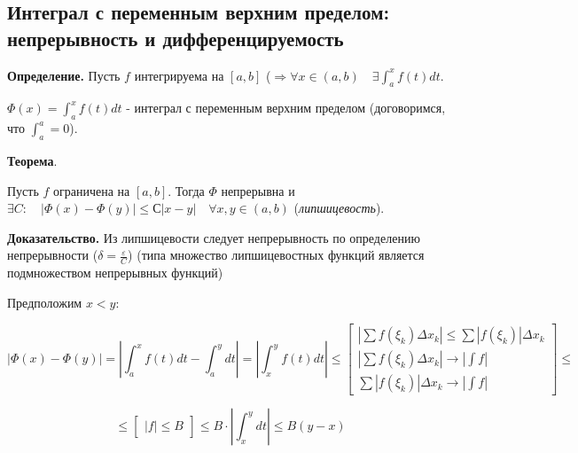 \documentclass[a4paper]{article}
\begin{document}
\begin{definit}
\subsection*{Интеграл с переменным верхним пределом: непрерывность и дифференцируемость}

\textbf{Определение.} Пусть $f$ интегрируема на $[a,b]$ ($\Rightarrow \forall x \in (a,b) \quad \exists \int_a^x f(t)dt$.

$\Phi(x) = \int_a^x f(t)dt$ - интеграл с переменным верхним пределом (договоримся, что $\int_a^a = 0$).

\begin{htheorem}\textbf{Теорема}.

Пусть $f$ ограничена на $[a,b]$. Тогда $\Phi$ непрерывна и $\exists C: \quad |\Phi(x) - \Phi(y)| \leq С|x-y| \quad \forall x, y \in (a,b)$ (\textit{липшицевость}).
\end{htheorem}

\begin{hproof}\textbf{Доказательство.}
Из липшицевости следует непрерывность по определению непрерывности ($\delta = \frac{\varepsilon}{C}$) (типа множество липшицевостных функций является подмножеством непрерывных функций)


Предположим $x<y$:

\[
	|\Phi(x) - \Phi(y)| = \left| \int_a^x f(t)dt - \int_a^y dt \right| = \left| \int_x^y f(t)dt \right| \leq \begin{bmatrix}
	\left| \sum f(\xi_k) \Delta x_k \right| \leq \sum \left| f(\xi_k) \right| \Delta x_k \\
	\left| \sum f(\xi_k) \Delta x_k \right| \rightarrow |\int f| \\
	 \sum \left| f(\xi_k) \right| \Delta x_k \rightarrow |\int f|
	\end{bmatrix} \leq
\]
 
\[ \leq
 \begin{bmatrix}
 |f| \leq B
 \end{bmatrix} \leq B \cdot \left| \int_x^y dt \right| \leq B(y-x)
\]
\end{hproof}


\end{definit}
\end{document}
